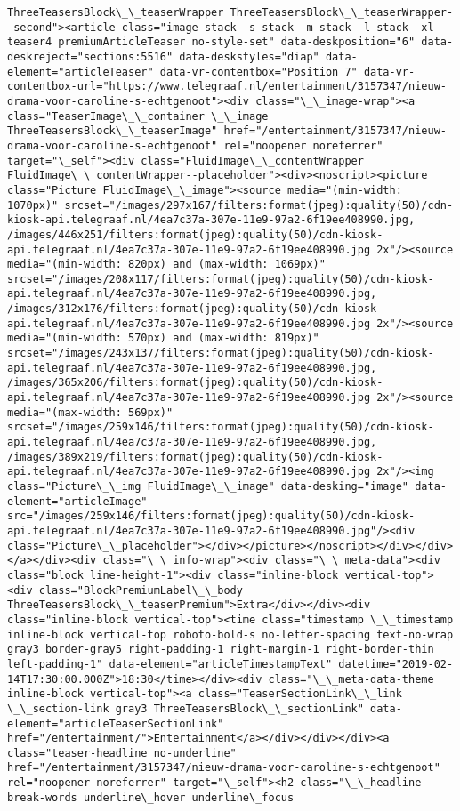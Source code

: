 \documentclass[11pt]{article}
\begin{document}
\begin{Verbatim}[commandchars=\\\{\}]
ThreeTeasersBlock\_\_teaserWrapper ThreeTeasersBlock\_\_teaserWrapper--second"><article class="image-stack--s stack--m stack--l stack--xl teaser4 premiumArticleTeaser no-style-set" data-deskposition="6" data-deskreject="sections:5516" data-deskstyles="diap" data-element="articleTeaser" data-vr-contentbox="Position 7" data-vr-contentbox-url="https://www.telegraaf.nl/entertainment/3157347/nieuw-drama-voor-caroline-s-echtgenoot"><div class="\_\_image-wrap"><a class="TeaserImage\_\_container \_\_image ThreeTeasersBlock\_\_teaserImage" href="/entertainment/3157347/nieuw-drama-voor-caroline-s-echtgenoot" rel="noopener noreferrer" target="\_self"><div class="FluidImage\_\_contentWrapper FluidImage\_\_contentWrapper--placeholder"><div><noscript><picture class="Picture FluidImage\_\_image"><source media="(min-width: 1070px)" srcset="/images/297x167/filters:format(jpeg):quality(50)/cdn-kiosk-api.telegraaf.nl/4ea7c37a-307e-11e9-97a2-6f19ee408990.jpg, /images/446x251/filters:format(jpeg):quality(50)/cdn-kiosk-api.telegraaf.nl/4ea7c37a-307e-11e9-97a2-6f19ee408990.jpg 2x"/><source media="(min-width: 820px) and (max-width: 1069px)" srcset="/images/208x117/filters:format(jpeg):quality(50)/cdn-kiosk-api.telegraaf.nl/4ea7c37a-307e-11e9-97a2-6f19ee408990.jpg, /images/312x176/filters:format(jpeg):quality(50)/cdn-kiosk-api.telegraaf.nl/4ea7c37a-307e-11e9-97a2-6f19ee408990.jpg 2x"/><source media="(min-width: 570px) and (max-width: 819px)" srcset="/images/243x137/filters:format(jpeg):quality(50)/cdn-kiosk-api.telegraaf.nl/4ea7c37a-307e-11e9-97a2-6f19ee408990.jpg, /images/365x206/filters:format(jpeg):quality(50)/cdn-kiosk-api.telegraaf.nl/4ea7c37a-307e-11e9-97a2-6f19ee408990.jpg 2x"/><source media="(max-width: 569px)" srcset="/images/259x146/filters:format(jpeg):quality(50)/cdn-kiosk-api.telegraaf.nl/4ea7c37a-307e-11e9-97a2-6f19ee408990.jpg, /images/389x219/filters:format(jpeg):quality(50)/cdn-kiosk-api.telegraaf.nl/4ea7c37a-307e-11e9-97a2-6f19ee408990.jpg 2x"/><img class="Picture\_\_img FluidImage\_\_image" data-desking="image" data-element="articleImage" src="/images/259x146/filters:format(jpeg):quality(50)/cdn-kiosk-api.telegraaf.nl/4ea7c37a-307e-11e9-97a2-6f19ee408990.jpg"/><div class="Picture\_\_placeholder"></div></picture></noscript></div></div></a></div><div class="\_\_info-wrap"><div class="\_\_meta-data"><div class="block line-height-1"><div class="inline-block vertical-top"><div class="BlockPremiumLabel\_\_body ThreeTeasersBlock\_\_teaserPremium">Extra</div></div><div class="inline-block vertical-top"><time class="timestamp \_\_timestamp inline-block vertical-top roboto-bold-s no-letter-spacing text-no-wrap gray3 border-gray5 right-padding-1 right-margin-1 right-border-thin left-padding-1" data-element="articleTimestampText" datetime="2019-02-14T17:30:00.000Z">18:30</time></div><div class="\_\_meta-data-theme inline-block vertical-top"><a class="TeaserSectionLink\_\_link \_\_section-link gray3 ThreeTeasersBlock\_\_sectionLink" data-element="articleTeaserSectionLink" href="/entertainment/">Entertainment</a></div></div></div><a class="teaser-headline no-underline" href="/entertainment/3157347/nieuw-drama-voor-caroline-s-echtgenoot" rel="noopener noreferrer" target="\_self"><h2 class="\_\_headline break-words underline\_hover underline\_focus 
\end{Verbatim}
\end{document}
